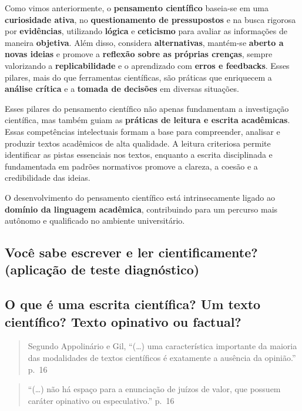 \documentclass[
]{book}
\begin{document}
Como vimos anteriormente, o \textbf{pensamento científico} baseia-se em uma \textbf{curiosidade ativa}, no \textbf{questionamento de pressupostos} e na busca rigorosa por \textbf{evidências}, utilizando \textbf{lógica} e \textbf{ceticismo} para avaliar as informações de maneira \textbf{objetiva}. Além disso, considera \textbf{alternativas}, mantém-se \textbf{aberto a novas ideias} e promove a \textbf{reflexão sobre as próprias crenças}, sempre valorizando a \textbf{replicabilidade} e o aprendizado com \textbf{erros e feedbacks}. Esses pilares, mais do que ferramentas científicas, são práticas que enriquecem a \textbf{análise crítica} e a \textbf{tomada de decisões} em diversas situações.

Esses pilares do pensamento científico não apenas fundamentam a investigação científica, mas também guiam as \textbf{práticas de leitura e escrita acadêmicas}. Essas competências intelectuais formam a base para compreender, analisar e produzir textos acadêmicos de alta qualidade. A leitura criteriosa permite identificar as pistas essenciais nos textos, enquanto a escrita disciplinada e fundamentada em padrões normativos promove a clareza, a coesão e a credibilidade das ideias.

O desenvolvimento do pensamento científico está intrinsecamente ligado ao \textbf{domínio da linguagem acadêmica}, contribuindo para um percurso mais autônomo e qualificado no ambiente universitário.

\subsection{Você sabe escrever e ler cientificamente? (aplicação de teste diagnóstico)}\label{vocuxea-sabe-escrever-e-ler-cientificamente-aplicauxe7uxe3o-de-teste-diagnuxf3stico}

\subsection{O que é uma escrita científica? Um texto científico? Texto opinativo ou factual?}\label{o-que-uxe9-uma-escrita-cientuxedfica-um-texto-cientuxedfico-texto-opinativo-ou-factual}

\begin{quote}
Segundo Appolinário e Gil, ``(\ldots) uma característica importante da maioria das modalidades de textos científicos é exatamente a ausência da opinião.'' p.~16
\end{quote}

\begin{quote}
``(\ldots) não há espaço para a enunciação de juízos de valor, que possuem caráter opinativo ou especulativo.'' p.~16
\end{quote}
\end{document}
